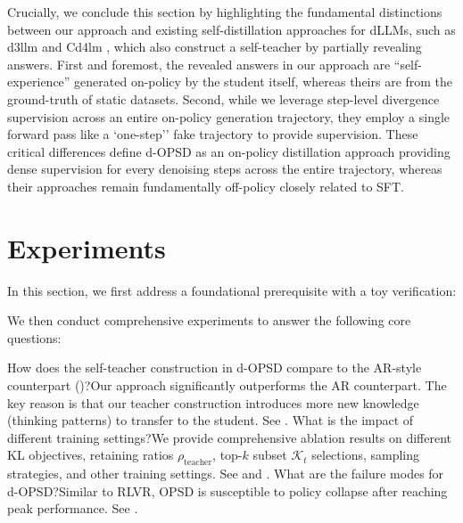 \documentclass{article}
\begin{document}
Crucially, we conclude this section by highlighting the fundamental distinctions between our approach and existing self-distillation approaches for dLLMs, such as d3llm \citep{qian2026d3llm} and Cd4lm \citep{liang2026cd4lm}, which also construct a self-teacher by partially revealing answers. First and foremost, the revealed answers in our approach are ``self-experience'' generated on-policy by the student itself, whereas theirs are from the ground-truth of static datasets. Second, while we leverage step-level divergence supervision across an entire on-policy generation trajectory, they employ a single forward pass like a `one-step'' fake trajectory to provide supervision. These critical differences define d-OPSD as an on-policy distillation approach providing dense supervision for every denoising steps across the entire trajectory, whereas their approaches remain fundamentally off-policy closely related to SFT.


\section{Experiments}


In this section, we first address a foundational prerequisite with a toy verification:


We then conduct comprehensive experiments to answer the following core questions:

{How does the self-teacher construction in d-OPSD compare to the AR-style counterpart ()?}{Our approach significantly outperforms the AR counterpart. The key reason is that our teacher construction introduces more new knowledge (thinking patterns) to transfer to the student. See .}
{What is the impact of different training settings?}{We provide comprehensive ablation results on different KL objectives, retaining ratios $\rho_\text{teacher}$, top-$k$ subset $\mathcal{K}_t$ selections, sampling strategies, and other training settings. See  and .}
{What are the failure modes for d-OPSD?}{Similar to RLVR,  OPSD is susceptible to policy collapse after reaching peak performance. See .}
\end{document}
